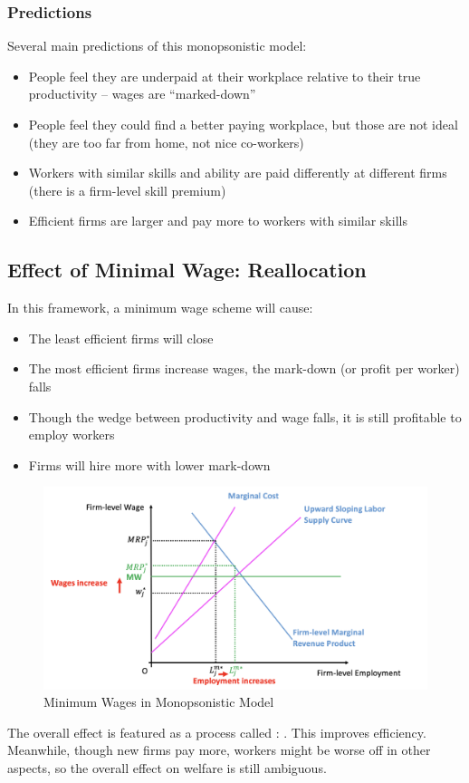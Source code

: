         \subsubsection{Predictions}
            Several main predictions of this monopsonistic model:
            \begin{itemize}
                \item People feel they are underpaid at their workplace relative to their true productivity – wages are “marked-down”
                \item People feel they could find a better paying workplace, but those are not ideal (they are too far from home, not nice co-workers)
                \item Workers with similar skills and ability are paid differently at different firms (there is a firm-level skill premium)
                \item Efficient firms are larger and pay more to workers with similar skills
            \end{itemize}
    
    \subsection{Effect of Minimal Wage: Reallocation}
        In this framework, a minimum wage scheme will cause:
        \begin{itemize}
            \item The least efficient firms will close
            \item The most efficient firms increase wages, the mark-down (or profit per worker) falls
            \item Though the wedge between productivity and wage falls, it is still profitable to employ workers
            \item Firms will hire more with lower mark-down
        \end{itemize}
        \begin{figure}[H]
            \centering
            \includegraphics[width=5in]{images/ch2/Monop_LM_2.png}
            \caption{Minimum Wages in Monopsonistic Model}
        \end{figure}
        The overall effect is featured as a process called : . This improves efficiency. Meanwhile, though new firms pay more, workers might be worse off in other aspects, so the overall effect on welfare is still ambiguous.
        
